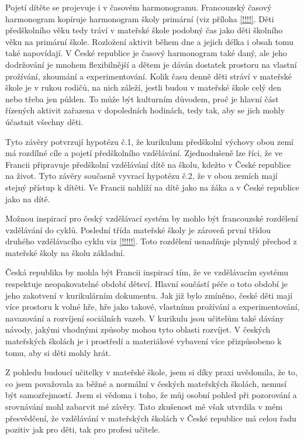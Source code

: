 Pojetí dítěte se projevuje i v časovém harmonogramu. Francouzský časový harmonogram kopíruje harmonogram školy primární (viz příloha \ref{!!!!}. Děti předškolního věku tedy tráví v mateřské škole podobný čas jako děti školního věku na primární škole. Rozložení aktivit během dne a jejich délka i obsah tomu také napovídají. V České republice je časový harmonogram také daný, ale jeho dodržování je mnohem flexibilnější a dětem je dáván dostatek prostoru na vlastní prožívání, zkoumání a experimentování. Kolik času denně  děti stráví v mateřské škole je v rukou rodičů, na nich záleží, jestli budou v mateřské škole celý den nebo třeba jen půlden. To může být kulturním důvodem, proč je hlavní část řízených aktivit zařazena v dopoledních hodinách, tedy tak, aby se jich mohly účastnit všechny děti. 

Tyto závěry potvrzují hypotézu č.1, že kurikulum předškolní výchovy obou zemí má rozdílné cíle a pojetí předškolního vzdělávání. Zjednodušeně lze říci, že ve Francii připravuje předškolní vzdělávání dítě na školu, kdežto v České republice na život. Tyto závěry současně vyvrací hypotézu č.2, že v obou zemích mají stejný přístup k dítěti. Ve Francii nahlíží na dítě jako na žáka a v České republice jako na dítě. 

Možnou inspirací pro český vzdělávací systém by mohlo být francouzské rozdělení vzdělávání do cyklů. Poslední třída mateřské školy je zároveň první třídou druhého vzdělávacího cyklu viz \ref{!!!!!}. Toto rozdělení usnadňuje plynulý přechod z mateřské školy na školu základní. 

Česká republika by mohla být Francii inspirací tím, že ve vzdělávacím systému respektuje neopakovatelné období dětsví. Hlavní součástí péče o toto období je jeho zakotvení v kurikulárním dokumentu. Jak již bylo zmíněno, české děti mají více prostoru k volné hře, hře jako takové, vlastnímu prožívání a experimentování, navazování a rozvíjení sociálních vazeb. V kurikulu jsou učitelům také dávány návody, jakými vhodnými způsoby mohou tyto oblasti rozvíjet. V českých mateřských školách je i prostředí a materiálové vybavení více přizpůsobeno k tomu, aby si děti mohly hrát.

Z pohledu budoucí učitelky v mateřské škole, jsem si díky praxi uvědomila, že to, co jsem považovala za běžné a normální v českých mateřských školách, nemusí být samozřejmostí. Jsem si vědoma i toho, že můj osobní pohled při pozorování a srovnávání mohl zabarvit mé závěry. Tato zkušenost mě však utvrdila v mém přesvědčení, že vzdělávání v mateřských školách v České republice má celou řadu pozitiv jak pro děti, tak pro profesi učitele. 